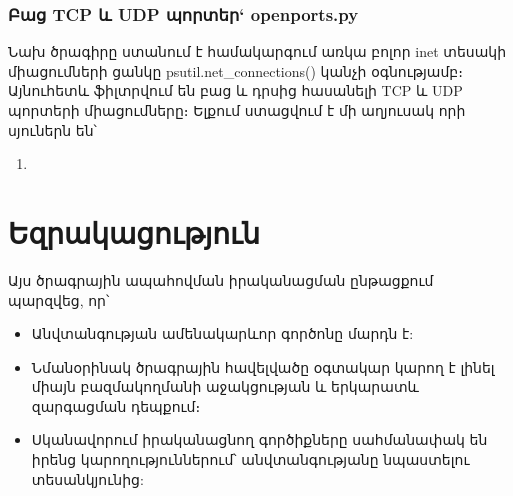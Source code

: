 \documentclass[12pt]{article}
\begin{document}
\begin{sloppypar}
\subsubsection{Բաց TCP և UDP պորտեր` openports.py}


Նախ ծրագիրը ստանում է համակարգում առկա բոլոր inet տեսակի միացումների ցանկը
psutil.net\_connections() կանչի օգնությամբ։
Այնուհետև ֆիլտրվում են բաց և դրսից հասանելի TCP և UDP պորտերի միացումները։
Ելքում ստացվում է մի աղյուսակ որի սյուներն են՝

\begin{enumerate}
\item 
\end{enumerate}


\newpage
\section{Եզրակացություն}

Այս ծրագրային ապահովման իրականացման ընթացքում պարզվեց, որ՝

\begin{itemize}
\item Անվտանգության ամենակարևոր գործոնը մարդն է:
\item Նմանօրինակ ծրագրային հավելվածը օգտակար կարող է
    լինել միայն բազմակողմանի աջակցության և երկարատև զարգացման
    դեպքում։
\item Սկանավորում իրականացնող գործիքները սահմանափակ են
    իրենց կարողություններում՝ անվտանգությանը նպաստելու
    տեսանկյունից:
\end{itemize}


\newpage

\end{sloppypar}
\end{document}
